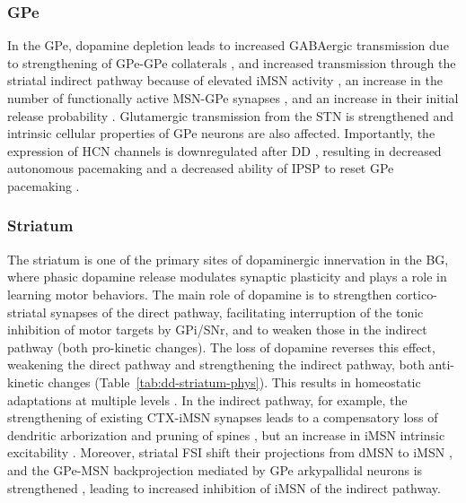 %
%
%

\subsubsection*{GPe}
\label{sec:ch2-dd-gpe}

In the GPe, dopamine depletion leads to increased GABAergic transmission
due to strengthening of GPe-GPe collaterals \cite{miguelez_altered_2012,watanabe_presynaptic_2009},
and increased transmission through the striatal indirect pathway because of
elevated iMSN activity \cite{mallet_cortical_2006,kita_cortical_2011},
an increase in the number of functionally active MSN-GPe synapses
\cite{ingham_plasticity_1997}, and an increase in their initial release probability
\cite{shin_dopamine_2003,cooper_dopamine_2001}. Glutamergic transmission
from the STN is strengthened \cite{matsui_activation_2003,hernandez_control_2006,johnson_gaba-_1997,kita_globus_2007}
and intrinsic cellular properties of GPe neurons are also affected. Importantly,
the expression of HCN channels is downregulated after DD \cite{chan_hcn_2011},
resulting in decreased autonomous pacemaking and a decreased ability of IPSP
to reset GPe pacemaking \cite{chan_hcn2_2004}.

%
%
%

\subsubsection*{Striatum}
\label{sec:ch2-dd-str}

The striatum is one of the primary sites of dopaminergic innervation in the BG,
where phasic dopamine release modulates synaptic plasticity and plays a role in
learning motor behaviors. The main role of dopamine is to strengthen cortico-striatal
synapses of the direct pathway, facilitating interruption of the tonic inhibition of motor %
targets by GPi/SNr, and to weaken those in the indirect pathway (both pro-kinetic changes).
The loss of dopamine reverses this effect, weakening the direct pathway and strengthening the
indirect pathway, both anti-kinetic changes (Table~\ref{tab:dd-striatum-phys}).
This results in homeostatic adaptations at multiple levels \cite{zhai_striatal_2018}.
In the indirect pathway, for example, the strengthening of existing CTX-iMSN synapses
leads to a compensatory loss of dendritic arborization and pruning of spines \cite{fieblinger_cell_2014,suarez_l-dopa_2014,day_selective_2006},
but an increase in iMSN intrinsic excitability \cite{hernandez-lopez_d2_2000,day_selective_2006}.
%
%
Moreover, striatal FSI shift their projections from dMSN to iMSN \cite{gittis_rapid_2011},
and the GPe-MSN backprojection mediated by GPe arkypallidal neurons is strengthened
\cite{corbit_pallidostriatal_2016}, leading to increased inhibition of iMSN of the indirect pathway.


